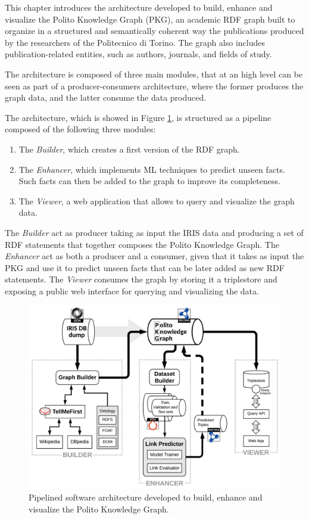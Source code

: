 \documentclass[%
    corpo=13.5pt,
    twoside,
    oldstyle,
    tipotesi=magistrale,
    greek,
    evenboxes
]{toptesi}
\begin{document}
This chapter introduces the architecture developed to build, enhance
and visualize the Polito Knowledge Graph (PKG), an academic RDF graph
built to organize in a structured and semantically coherent way the publications
produced by the researchers of the Politecnico di Torino. The graph
also includes publication-related entities, such as authors, journals,
and fields of study.

The architecture is composed of three main modules, that at an high level
can be seen as part of a producer-consumers architecture, where the former
produces the graph data, and the latter consume the data produced.

The architecture, which is showed in Figure \ref{fig:pipeline}, is structured
as a pipeline composed of the following three modules:

\begin{enumerate}
    \item The \emph{Builder}, which creates a first version of the
    RDF graph.
    \item The \emph{Enhancer}, which implements ML techniques to predict
    unseen facts. Such facts can then be added to the graph to improve its
    completeness.
    \item The \emph{Viewer}, a web application that allows to query
    and visualize the graph data.
\end{enumerate}

The \emph{Builder} act as producer taking as input the IRIS data
and producing a set of RDF statements that together composes the
Polito Knowledge Graph.
The \emph{Enhancer} act as both a producer and a consumer, given that it
takes as input the PKG and use it to predict unseen facts that can be
later added as new RDF statements.
The \emph{Viewer} consumes the graph by storing it a triplestore and exposing
a public web interface for querying and visualizing the data.


\begin{figure}[h]
    \centering
    \includegraphics[scale=0.8]{img/pipeline.png}
    \caption{Pipelined software architecture developed to build,
    enhance and visualize the Polito Knowledge Graph.}
    \label{fig:pipeline}
\end{figure}
\end{document}
